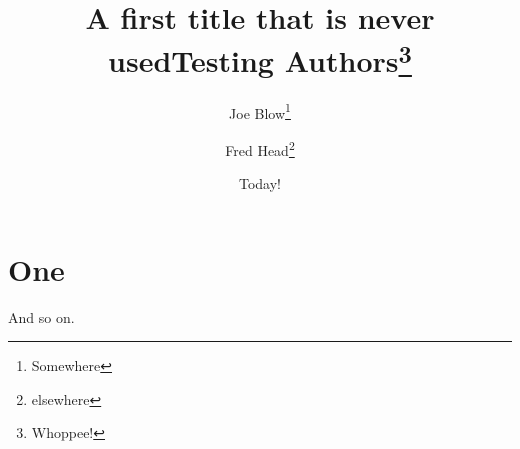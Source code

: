 \documentclass{article}
\title{A first title that is never used}
\title{Testing Authors\thanks{Whoppee!}}
\author{Joe Blow\thanks{Somewhere}\and Fred Head\thanks{elsewhere}}
\date{Today!}
\begin{document}
\maketitle
\section{One}\label{sec:one}
And so on.
\end{document}
